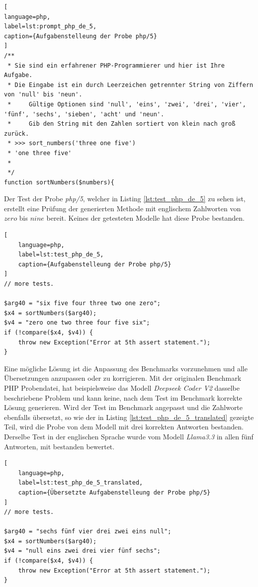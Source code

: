 \begin{lstlisting}[
language=php,
label=lst:prompt_php_de_5,
caption={Aufgabenstelleung der Probe php/5}
]
/**
 * Sie sind ein erfahrener PHP-Programmierer und hier ist Ihre Aufgabe.
 * Die Eingabe ist ein durch Leerzeichen getrennter String von Ziffern von 'null' bis 'neun'.
 *     Gültige Optionen sind 'null', 'eins', 'zwei', 'drei', 'vier', 'fünf', 'sechs', 'sieben', 'acht' und 'neun'.
 *     Gib den String mit den Zahlen sortiert von klein nach groß zurück.
 * >>> sort_numbers('three one five')
 * 'one three five'
 *
 */
function sortNumbers($numbers){
\end{lstlisting}

Der Test der Probe \textit{php/5}, welcher in Listing \ref{lst:test_php_de_5} zu sehen ist, erstellt eine Prüfung der generierten Methode mit englischem Zahlworten von $zero$ bis $nine$ bereit. Keines der getesteten Modelle hat diese Probe bestanden.

\begin{lstlisting}[
	language=php,
	label=lst:test_php_de_5,
	caption={Aufgabenstelleung der Probe php/5}
]
// more tests.

$arg40 = "six five four three two one zero";
$x4 = sortNumbers($arg40);
$v4 = "zero one two three four five six";
if (!compare($x4, $v4)) {
    throw new Exception("Error at 5th assert statement.");
}
\end{lstlisting}

Eine mögliche Lösung ist die Anpassung des Benchmarks vorzunehmen und alle Übersetzungen anzupassen oder zu korrigieren. Mit der originalen Benchmark PHP Probendatei, hat beispielsweise das Modell \textit{Deepseek Coder V2} dasselbe beschriebene Problem und kann keine, nach dem Test im Benchmark korrekte Lösung generieren. Wird der Test im Benchmark angepasst und die Zahlworte ebenfalls übersetzt, so wie der in Listing \ref{lst:test_php_de_5_translated} gezeigte Teil, wird die Probe von dem Modell mit drei korrekten Antworten bestanden. Derselbe Test in der englischen Sprache wurde vom Modell \textit{Llama3.3} in allen fünf Antworten, mit bestanden bewertet.\vspace{0.2cm}

\begin{lstlisting}[
	language=php,
	label=lst:test_php_de_5_translated,
	caption={Übersetzte Aufgabenstelleung der Probe php/5}
]
// more tests.

$arg40 = "sechs fünf vier drei zwei eins null";
$x4 = sortNumbers($arg40);
$v4 = "null eins zwei drei vier fünf sechs";
if (!compare($x4, $v4)) {
    throw new Exception("Error at 5th assert statement.");
}
\end{lstlisting}

